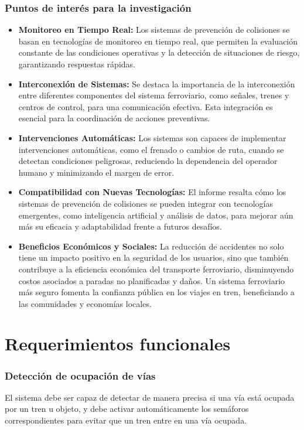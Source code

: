 \documentclass[journal]{IEEEtran}
\begin{document}
\subsubsection*{Puntos de interés para la investigación}
\begin{itemize}
    \item \textbf{Monitoreo en Tiempo Real:}
    Los sistemas de prevención de colisiones se basan en tecnologías de monitoreo en tiempo real, que permiten la evaluación constante de las condiciones operativas y la detección de situaciones de riesgo, garantizando respuestas rápidas\cite{intel2022collision}.
    \item \textbf{Interconexión de Sistemas:}
    Se destaca la importancia de la interconexión entre diferentes componentes del sistema ferroviario, como señales, trenes y centros de control, para una comunicación efectiva. Esta integración es esencial para la coordinación de acciones preventivas\cite{intel2022collision}.
    \item \textbf{Intervenciones Automáticas:}
    Los sistemas son capaces de implementar intervenciones automáticas, como el frenado o cambios de ruta, cuando se detectan condiciones peligrosas, reduciendo la dependencia del operador humano y minimizando el margen de error\cite{intel2022collision}.
    \item \textbf{Compatibilidad con Nuevas Tecnologías:}
    El informe resalta cómo los sistemas de prevención de colisiones se pueden integrar con tecnologías emergentes, como inteligencia artificial y análisis de datos, para mejorar aún más su eficacia y adaptabilidad frente a futuros desafíos\cite{intel2022collision}.
    \item \textbf{Beneficios Económicos y Sociales:}
    La reducción de accidentes no solo tiene un impacto positivo en la seguridad de los usuarios, sino que también contribuye a la eficiencia económica del transporte ferroviario, disminuyendo costos asociados a paradas no planificadas y daños. Un sistema ferroviario más seguro fomenta la confianza pública en los viajes en tren, beneficiando a las comunidades y economías locales\cite{intel2022collision}.
\end{itemize}

\section{Requerimientos funcionales}

\subsubsection{Detección de ocupación de vías} 
El sistema debe ser capaz de detectar de manera precisa si una vía está ocupada por un tren u objeto, y debe activar automáticamente los semáforos correspondientes para evitar que un tren entre en una vía ocupada.
\end{document}
